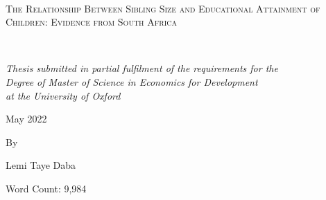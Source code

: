 \begin{titlepage}
	\centering
	\vspace*{1.5cm}
	\hrulefill\\
	\vspace{0.5cm}
	{\scshape\LARGE The Relationship Between Sibling Size and Educational Attainment of Children: Evidence from South Africa\par}
	\vspace{0.5cm}
	\hrulefill\\
	\vspace{1.5cm}

	{\normalsize\itshape Thesis submitted in partial fulfilment of the requirements for the\\
Degree of Master of Science in Economics for Development\\
at the University of Oxford\par}
	
	\vspace{0.6cm}

	\vspace{2.8cm}
	{\normalsize May 2022 \par}
	
	
	\vspace{1.2cm}
	{\normalsize By \par}
	
	\vspace{1.2cm}
	{\large Lemi Taye Daba}
	
	
	\vspace{2.5cm}
	{\normalsize Word Count: 9,984}


\end{titlepage}